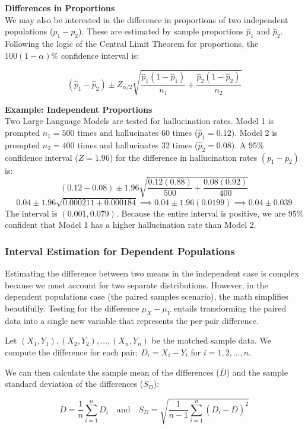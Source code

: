 \documentclass{article}
\begin{document}
\vspace{1em}
\textbf{Differences in Proportions} \\
We may also be interested in the difference in proportions of two independent populations ($p_1 - p_2$). These are estimated by sample proportions $\hat{p}_1$ and $\hat{p}_2$. Following the logic of the Central Limit Theorem for proportions, the $100(1-\alpha)\%$ confidence interval is:

$$
(\hat{p}_1 - \hat{p}_2) \pm Z_{\alpha/2} \sqrt{\frac{\hat{p}_1 (1 - \hat{p}_1) }{n_1} + \frac{\hat{p}_2 (1 - \hat{p}_2) }{n_2}}
$$

\textbf{Example: Independent Proportions} \\
Two Large Language Models are tested for hallucination rates. Model 1 is prompted $n_1=500$ times and hallucinates $60$ times ($\hat{p}_1 = 0.12$). Model 2 is prompted $n_2=400$ times and hallucinates $32$ times ($\hat{p}_2 = 0.08$). A $95\%$ confidence interval ($Z = 1.96$) for the difference in hallucination rates $(p_1 - p_2)$ is:
$$ (0.12 - 0.08) \pm 1.96 \sqrt{\frac{0.12(0.88)}{500} + \frac{0.08(0.92)}{400}} $$
$$ 0.04 \pm 1.96 \sqrt{0.000211 + 0.000184} \implies 0.04 \pm 1.96(0.0199) \implies 0.04 \pm 0.039 $$
The interval is $(0.001, 0.079)$. Because the entire interval is positive, we are $95\%$ confident that Model 1 has a higher hallucination rate than Model 2.

\subsubsection{Interval Estimation for Dependent Populations}

Estimating the difference between two means in the independent case is complex because we must account for two separate distributions. However, in the dependent populations case (the paired samples scenario), the math simplifies beautifully. Testing for the difference $\mu_X - \mu_Y$ entails transforming the paired data into a single new variable that represents the per-pair difference.

Let $(X_1, Y_1), (X_2, Y_2), \dots, (X_n, Y_n)$ be the matched sample data. We compute the difference for each pair: $D_i = X_i - Y_i$ for $i = 1,2,\dots,n$. 

We can then calculate the sample mean of the differences ($\bar{D}$) and the sample standard deviation of the differences ($S_D$):

$$ \bar{D} = \frac{1}{n} \sum_{i=1}^{n}D_i \quad \text{and} \quad S_D = \sqrt{\frac{1}{n-1} \sum_{i=1}^{n}(D_i - \bar{D})^2} $$
\end{document}
